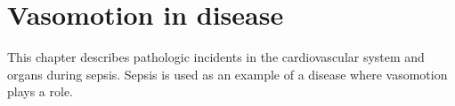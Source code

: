 \chapter{Vasomotion in disease}
This chapter describes pathologic incidents in the cardiovascular system and organs during sepsis. Sepsis is used as an example of a disease where vasomotion plays a role.